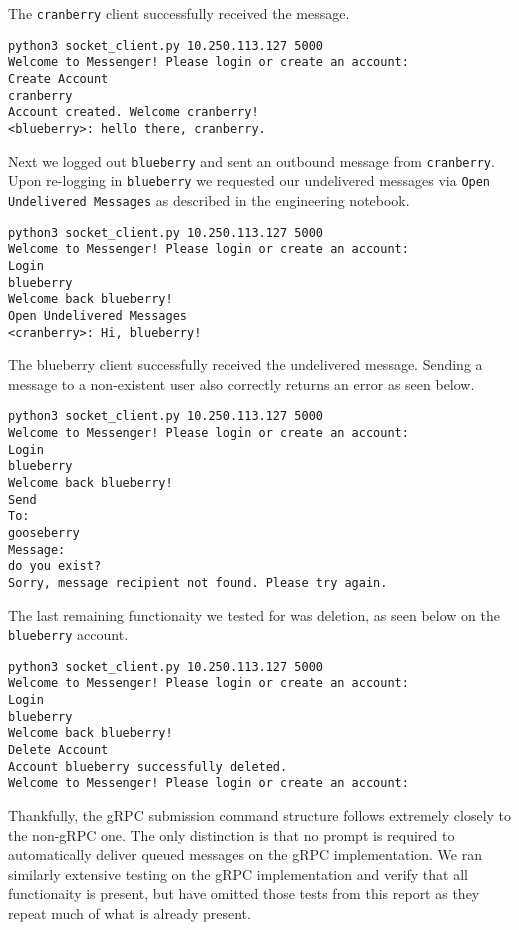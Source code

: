 \documentclass[9pt,twocolumn,twoside]{osajnl}
\begin{document}
\noindent The \texttt{cranberry} client successfully received the message.

\begin{lstlisting}[caption={Receive Live Message Test}]
python3 socket_client.py 10.250.113.127 5000
Welcome to Messenger! Please login or create an account:
Create Account
cranberry
Account created. Welcome cranberry!
<blueberry>: hello there, cranberry.
\end{lstlisting}

\noindent Next we logged out \texttt{blueberry} and sent an outbound message from \texttt{cranberry}. Upon re-logging in \texttt{blueberry} we requested our undelivered messages via \texttt{Open Undelivered Messages} as described in the engineering notebook.

\begin{lstlisting}[caption={Receive Undelivered Message Test}]
python3 socket_client.py 10.250.113.127 5000
Welcome to Messenger! Please login or create an account:
Login 
blueberry
Welcome back blueberry!
Open Undelivered Messages
<cranberry>: Hi, blueberry!
\end{lstlisting}

\noindent The blueberry client successfully received the undelivered message. Sending a message to a non-existent user also correctly returns an error as seen below.

\begin{lstlisting}[caption={Send Message to Nonexistent User Test}]
python3 socket_client.py 10.250.113.127 5000
Welcome to Messenger! Please login or create an account:
Login
blueberry
Welcome back blueberry!
Send
To: 
gooseberry
Message: 
do you exist?
Sorry, message recipient not found. Please try again. 
\end{lstlisting}

\noindent The last remaining functionaity we tested for was deletion, as seen below on the \texttt{blueberry} account.

\begin{lstlisting}[caption={Account Deletion Test}]
python3 socket_client.py 10.250.113.127 5000
Welcome to Messenger! Please login or create an account:
Login
blueberry
Welcome back blueberry!
Delete Account
Account blueberry successfully deleted. 
Welcome to Messenger! Please login or create an account:
\end{lstlisting}

\noindent Thankfully, the gRPC submission command structure follows extremely closely to the non-gRPC one. The only distinction is that no prompt is required to
automatically deliver queued messages on the gRPC implementation. We ran similarly extensive testing on the gRPC implementation and verify that all functionaity is present, but have omitted those tests from this report as they repeat much of what is already present.
\end{document}
